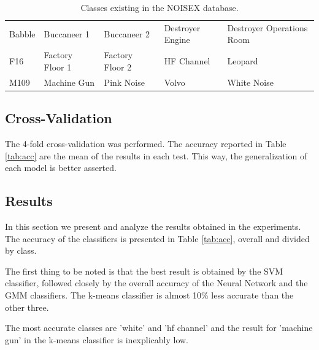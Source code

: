 \documentclass[12pt]{article}
\begin{document}
\begin{table}[ht]
	\centering
	\caption{Classes existing in the NOISEX database.}
	\label{tab:noisex}
	\begin{tabular}{lllll}
		\hline
		Babble & Buccaneer 1 & Buccaneer 2 & Destroyer Engine& Destroyer Operations Room\\
		F16 & Factory Floor 1 & Factory Floor 2 & HF Channel & Leopard\\
		M109 & Machine Gun & Pink Noise & Volvo & White Noise\\
		\hline
	\end{tabular}
\end{table}

\subsection{Cross-Validation} \label{exp:crossv}

The 4-fold cross-validation was performed. The accuracy reported in Table \ref{tab:acc} are the mean of the results in each test. This way, the generalization of each model is better asserted.

\subsection{Results} \label{exp:res}


In this section we present and analyze the results obtained in the experiments. The accuracy of the classifiers is presented in Table \ref{tab:acc}, overall and divided by class.

The first thing to be noted is that the best result is obtained by the SVM classifier, followed closely by the overall accuracy of the Neural Network and the GMM classifiers. The k-means classifier is almost 10\% less accurate than the other three.

The most accurate classes are 'white' and 'hf channel' and the result for 'machine gun' in the k-means classifier is inexplicably low.
\end{document}
